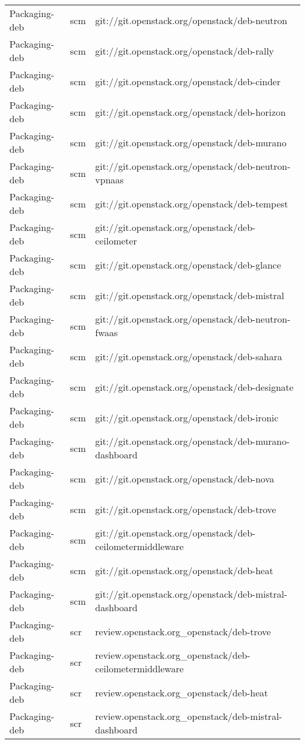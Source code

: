 \begin{center}
\begin{longtable}{|p{4cm}|p{1cm}|p{10cm}|}
Packaging-deb&scm&git://git.openstack.org/openstack/deb-neutron\\ 
Packaging-deb&scm&git://git.openstack.org/openstack/deb-rally\\ 
Packaging-deb&scm&git://git.openstack.org/openstack/deb-cinder\\ 
Packaging-deb&scm&git://git.openstack.org/openstack/deb-horizon\\ 
Packaging-deb&scm&git://git.openstack.org/openstack/deb-murano\\ 
Packaging-deb&scm&git://git.openstack.org/openstack/deb-neutron-vpnaas\\ 
Packaging-deb&scm&git://git.openstack.org/openstack/deb-tempest\\ 
Packaging-deb&scm&git://git.openstack.org/openstack/deb-ceilometer\\ 
Packaging-deb&scm&git://git.openstack.org/openstack/deb-glance\\ 
Packaging-deb&scm&git://git.openstack.org/openstack/deb-mistral\\ 
Packaging-deb&scm&git://git.openstack.org/openstack/deb-neutron-fwaas\\ 
Packaging-deb&scm&git://git.openstack.org/openstack/deb-sahara\\ 
Packaging-deb&scm&git://git.openstack.org/openstack/deb-designate\\ 
Packaging-deb&scm&git://git.openstack.org/openstack/deb-ironic\\ 
Packaging-deb&scm&git://git.openstack.org/openstack/deb-murano-dashboard\\ 
Packaging-deb&scm&git://git.openstack.org/openstack/deb-nova\\ 
Packaging-deb&scm&git://git.openstack.org/openstack/deb-trove\\ 
Packaging-deb&scm&git://git.openstack.org/openstack/deb-ceilometermiddleware\\ 
Packaging-deb&scm&git://git.openstack.org/openstack/deb-heat\\ 
Packaging-deb&scm&git://git.openstack.org/openstack/deb-mistral-dashboard\\ 
Packaging-deb&scr&review.openstack.org\_openstack/deb-trove\\ 
Packaging-deb&scr&review.openstack.org\_openstack/deb-ceilometermiddleware\\ 
Packaging-deb&scr&review.openstack.org\_openstack/deb-heat\\ 
Packaging-deb&scr&review.openstack.org\_openstack/deb-mistral-dashboard\\ 

\end{longtable}
\end{center}
